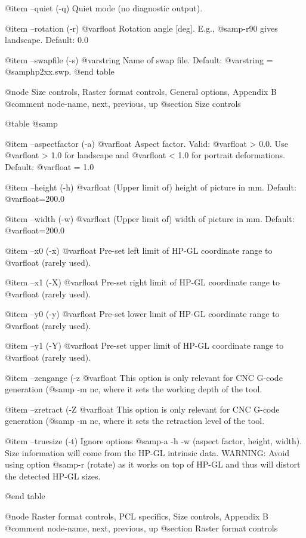 @item --quiet (-q)
Quiet mode (no diagnostic output).

@item --rotation (-r) @var{float}
Rotation angle [deg]. E.g., @samp{-r90} gives landscape. Default: 0.0

@item --swapfile (-s) @var{string}
Name of swap file. Default: @var{string} = @samp{hp2xx.swp}.
@end table



@node Size controls, Raster format controls, General options, Appendix B
@comment  node-name,  next,  previous,  up
@section Size controls

@table @samp

@item --aspectfactor (-a) @var{float}
Aspect factor. Valid: @var{float} > 0.0. Use @var{float} > 1.0 for landscape
and @var{float} < 1.0 for portrait deformations. Default: @var{float} = 1.0

@item --height (-h) @var{float}
(Upper limit of) height of picture in mm. Default: @var{float}=200.0

@item --width (-w) @var{float}
(Upper limit of) width of picture in mm. Default: @var{float}=200.0

@item --x0 (-x) @var{float}
Pre-set left limit of HP-GL coordinate range to @var{float} (rarely used).

@item --x1 (-X) @var{float}
Pre-set right limit of HP-GL coordinate range to @var{float} (rarely used).

@item --y0 (-y) @var{float}
Pre-set lower limit of HP-GL coordinate range to @var{float} (rarely used).

@item --y1 (-Y) @var{float}
Pre-set upper limit of HP-GL coordinate range to @var{float} (rarely used).

@item --zengange (-z @var{float}
This option is only relevant for CNC G-code generation (@samp{ -m nc}, where
it sets the working depth of the tool.

@item --zretract (-Z @var{float}
This option is only relevant for CNC G-code generation (@samp{ -m nc}, where
it sets the retraction level of the tool.

@item --truesize (-t)
Ignore options @samp{-a -h -w} (aspect factor, height, width). Size information
will come from the HP-GL intrinsic data. WARNING: Avoid using option @samp{-r}
(rotate) as it works on top of HP-GL and thus will distort the detected HP-GL
sizes.

@end table



@node Raster format controls, PCL specifics, Size controls, Appendix B
@comment  node-name,  next,  previous,  up
@section  Raster format controls

